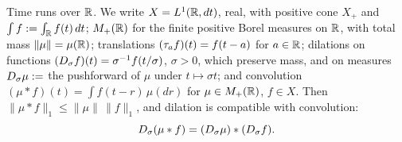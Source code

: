%
%
%
%
%
%
%

Time runs over $\mathbb{R}$. We write $X = L^1(\mathbb{R}, dt)$, real, with positive cone $X_+$ and
$\int f := \int_{\mathbb{R}} f(t)\,dt$; $M_+(\mathbb{R})$ for the finite positive Borel measures on
$\mathbb{R}$, with total mass $\|\mu\| = \mu(\mathbb{R})$; translations $(\tau_a f)(t) = f(t-a)$ for
$a \in \mathbb{R}$; dilations on functions $(D_\sigma f)(t) = \sigma^{-1} f(t/\sigma)$,
$\sigma > 0$, which preserve mass, and on measures $D_\sigma \mu :=$ the pushforward of
$\mu$ under $t \mapsto \sigma t$; and convolution
$(\mu * f)(t) = \int f(t - r)\,\mu(dr)$ for $\mu \in M_+(\mathbb{R})$, $f \in X$. Then
$\|\mu * f\|_1 \le \|\mu\|\,\|f\|_1$, and dilation is compatible with convolution:
\[
  D_\sigma(\mu * f) = (D_\sigma \mu) * (D_\sigma f).
\]

